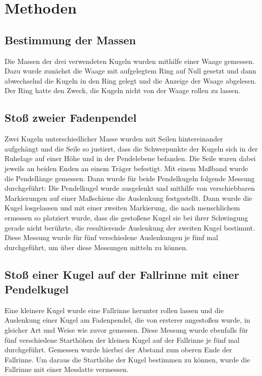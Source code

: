 \documentclass[
	a4paper,
	12pt,
	pagesize,
	ngerman
]{scrartcl}
\begin{document}
	\section{Methoden}
	\subsection{Bestimmung der Massen}
	Die Massen der drei verwendeten Kugeln wurden mithilfe einer Waage gemessen.
	Dazu wurde zunächst die Waage mit aufgelegtem Ring auf Null gesetzt und dann abwechselnd die Kugeln in den Ring gelegt und die Anzeige der Waage abgelesen.
	Der Ring hatte den Zweck, die Kugeln nicht von der Waage rollen zu lassen. %
	
	\subsection{Stoß zweier Fadenpendel} %
	Zwei Kugeln unterschiedlicher Masse wurden mit Seilen hintereinander aufgehängt und die Seile so justiert, dass die Schwerpunkte der Kugeln sich in der Ruhelage auf einer Höhe und in der Pendelebene befanden.
	Die Seile waren dabei jeweils an beiden Enden an einem Träger befestigt.
	Mit einem Maßband wurde die Pendellänge gemessen.
	Dann wurde für beide Pendelkugeln folgende Messung durchgeführt:
	Die Pendelkugel wurde ausgelenkt und mithilfe von verschiebbaren Markierungen auf einer Maßschiene die Auslenkung festgestellt.
	Dann wurde die Kugel losgelassen und mit einer zweiten Markierung, die nach menschlichem ermessen so platziert wurde, dass die gestoßene Kugel sie bei ihrer Schwingung gerade nicht berührte, die resultierende Auslenkung der zweiten Kugel bestimmt.
	Diese Messung wurde für fünf verschiedene Auslenkungen je fünf mal durchgeführt, um über diese Messungen mitteln zu können. %
	\subsection{Stoß einer Kugel auf der Fallrinne mit einer Pendelkugel} %
	Eine kleinere Kugel wurde eine Fallrinne herunter rollen lassen und die Auslenkung einer Kugel am Fadenpendel, die von ersterer angestoßen wurde, in gleicher Art und Weise wie zuvor gemessen.
	Diese Messung wurde ebenfalls für fünf  verschiedene Starthöhen der kleinen Kugel auf der Fallrinne je fünf mal durchgeführt.
	Gemessen wurde hierbei der Abstand zum oberen Ende der Fallrinne.
	Um daraus die Starthöhe der Kugel bestimmen zu können, wurde die Fallrinne mit einer Messlatte vermessen. %
	
\end{document}
